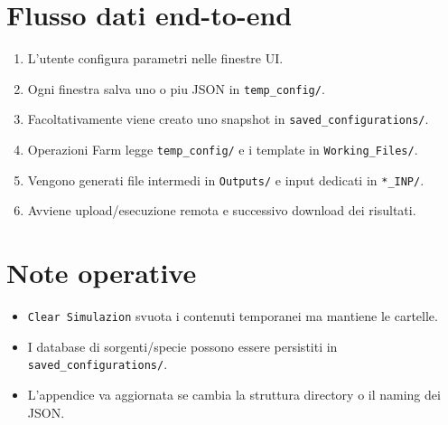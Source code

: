 \section{Flusso dati end-to-end}
\begin{enumerate}[leftmargin=1.8em]
  \item L'utente configura parametri nelle finestre UI.
  \item Ogni finestra salva uno o piu JSON in \texttt{temp\_config/}.
  \item Facoltativamente viene creato uno snapshot in \texttt{saved\_configurations/}.
  \item Operazioni Farm legge \texttt{temp\_config/} e i template in \texttt{Working\_Files/}.
  \item Vengono generati file intermedi in \texttt{Outputs/} e input dedicati in \texttt{*\_INP/}.
  \item Avviene upload/esecuzione remota e successivo download dei risultati.
\end{enumerate}

\section{Note operative}
\begin{itemize}[leftmargin=1.5em]
  \item \texttt{Clear Simulazion} svuota i contenuti temporanei ma mantiene le cartelle.
  \item I database di sorgenti/specie possono essere persistiti in \texttt{saved\_configurations/}.
  \item L'appendice va aggiornata se cambia la struttura directory o il naming dei JSON.
\end{itemize}
